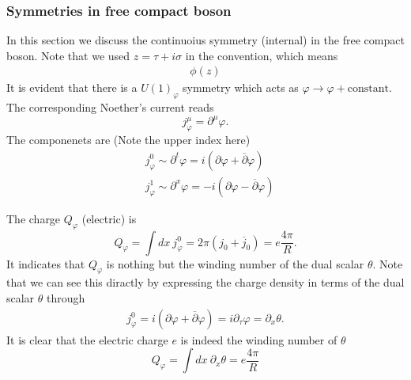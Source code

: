 \documentclass[submission, PhysLectNotes]{SciPost}
\begin{document}
\subsubsection{Symmetries in free compact boson}
In this section we discuss the continuoius symmetry (internal) in the free compact boson. Note that we used $z = \tau + i\sigma$ in the convention, which means
\begin{equation}
	\begin{aligned}
		\phi(z) 
	\end{aligned}
\end{equation}
It is evident that there is a ${U(1)}_\varphi$ symmetry which acts as $\varphi \rightarrow \varphi + \mathrm{constant}$. The corresponding Noether's current reads
\begin{equation}
	j^\mu_\varphi = \partial^\mu \varphi.
\end{equation}  
The componenets are (Note the upper index here)
\begin{equation}
	\begin{aligned}
		&j^0_\varphi \sim \partial^t\varphi = i \left(\partial \varphi + \overline{\partial} {\varphi}\right) \\
		&j^1_\varphi \sim \partial^x\varphi = -i\left( \partial \varphi - \overline{\partial}\varphi \right)
	\end{aligned}
\end{equation}

The charge $Q_\varphi$ (electric) is 
\begin{equation}
	Q_\varphi = \int dx \ j^0_\varphi = 2\pi\left(j_0 + \overline{j}_0\right) = e \frac{4\pi}{R}.
\end{equation}
It indicates that $Q_\varphi$ is nothing but the winding number of the dual scalar $\theta$. Note that we can see this diractly by expressing the charge density in terms of the dual scalar $\theta$ through
\begin{equation}
	\begin{aligned}
		j^0_\varphi = i \left(\partial \varphi + \overline{\partial} \varphi\right) = i \partial_\tau \varphi = \partial_x \theta.
	\end{aligned}
\end{equation}
It is clear that the electric charge $e$ is indeed the winding number of $\theta$ 
\begin{equation}
	Q_\varphi = \int dx \ \partial_x \theta = e \frac{4\pi}{R}
\end{equation}
\end{document}
